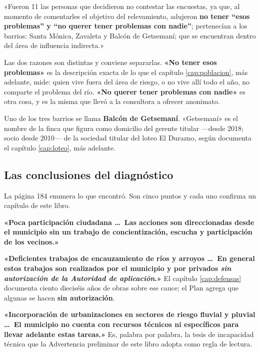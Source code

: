 \begin{cautela}
«Fueron 11 las personas que decidieron no contestar las encuestas, ya que, al momento de
comentarles el objetivo del relevamiento, adujeron \textbf{no tener “esos problemas” y “no
querer tener problemas con nadie”}; pertenecían a los barrios: Santa Mónica, Zavaleta y
Balcón de Getsemaní; que se encuentran dentro del área de influencia indirecta.»

Las dos razones son distintas y conviene separarlas. \textbf{«No tener esos problemas»} es la
descripción exacta de lo que el capítulo \ref{cap:poblacion}, más adelante, mide: quien vive fuera del área de riesgo, o no
vive allí todo el año, no comparte el problema del río. \textbf{«No querer tener problemas
con nadie»} es otra cosa, y es la misma que llevó a la consultora a ofrecer anonimato.

Uno de los tres barrios se llama \textbf{Balcón de Getsemaní}. «Getsemaní» es el nombre de la
finca que figura como domicilio del gerente titular ---desde 2018; socio desde 2010--- de la sociedad titular del loteo El
Durazno, según documenta el capítulo \ref{cap:loteo}, más adelante.
\end{cautela}

\subsection*{Las conclusiones del diagnóstico}

La página 184 enumera lo que encontró. Son cinco puntos y cada uno confirma un capítulo de
este libro.

\textbf{«Poca participación ciudadana \ldots\ Las acciones son direccionadas desde el municipio
sin un trabajo de concientización, escucha y participación de los vecinos.»}

\textbf{«Deficientes trabajos de encauzamiento de ríos y arroyos \ldots\ En general estos
trabajos son realizados por el municipio y por privados \textit{sin autorización de la
Autoridad de aplicación}.»} El capítulo \ref{cap:defensas} documenta ciento dieciséis años de obras sobre ese cauce; el Plan agrega que algunas se hacen \textbf{sin autorización}.

\textbf{«Incorporación de urbanizaciones en sectores de riesgo fluvial y pluvial \ldots\ El
municipio no cuenta con recursos técnicos ni específicos para llevar adelante estas tareas.»}
Es, palabra por palabra, la tesis de incapacidad técnica que la Advertencia preliminar de
este libro adopta como regla de lectura.

